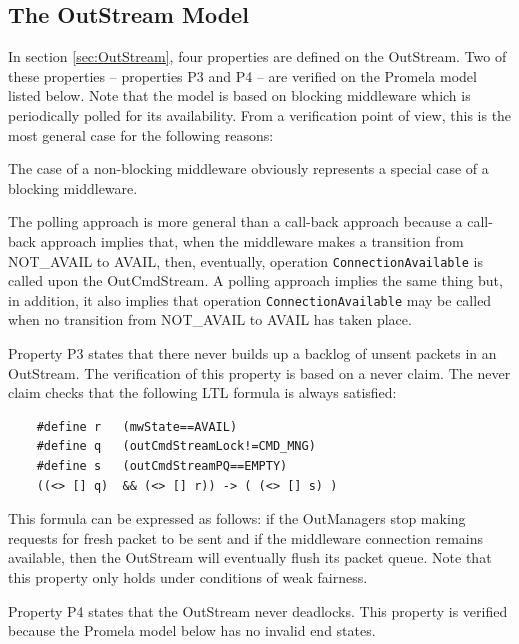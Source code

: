 \documentclass[a4paper,10pt]{article}
\newenvironment{fw_itemize}						%
{\begin{itemize}
  \setlength{\itemsep}{1mm}
  \setlength{\parskip}{0pt}
  \setlength{\parsep}{0pt}}
{\end{itemize}}
\begin{document}
\subsection{The OutStream Model}\label{sec:OutStreamModel}

In section \ref{sec:OutStream}, four properties are defined on the OutStream. Two of these properties – properties P3 and P4 – are verified on the Promela model listed below. Note that the model is based on blocking middleware which is periodically polled for its availability. From a verification point of view, this is the most general case for the following reasons:
\begin{fw_itemize}
\item The case of a non-blocking middleware obviously represents a special case of a blocking middleware.
\item The polling approach is more general than a call-back approach because a call-back approach implies that, when the middleware makes a transition from NOT\_AVAIL to AVAIL, then, eventually, operation \texttt{ConnectionAvailable} is called upon the OutCmdStream. A polling approach implies the same thing but, in addition, it also implies that operation \texttt{ConnectionAvailable} may be called when no transition from NOT\_AVAIL to AVAIL has taken place.
\end{fw_itemize}
Property P3 states that there never builds up a backlog of unsent packets in an OutStream. The verification of this property is based on a never claim. The never claim checks that the following LTL formula is always satisfied:

\lstset{belowskip=-14pt} %
\begin{lstlisting}
	#define r	(mwState==AVAIL)
	#define q	(outCmdStreamLock!=CMD_MNG)
	#define s	(outCmdStreamPQ==EMPTY)
	((<> [] q)  && (<> [] r)) -> ( (<> [] s) )
\end{lstlisting}

This formula can be expressed as follows: if the OutManagers stop making requests for fresh packet to be sent and if the middleware connection remains available, then the OutStream will eventually flush its packet queue. Note that this property only holds under conditions of weak fairness. 

Property P4 states that the OutStream never deadlocks. This property is verified because the Promela model below has no invalid end states.
\end{document}

